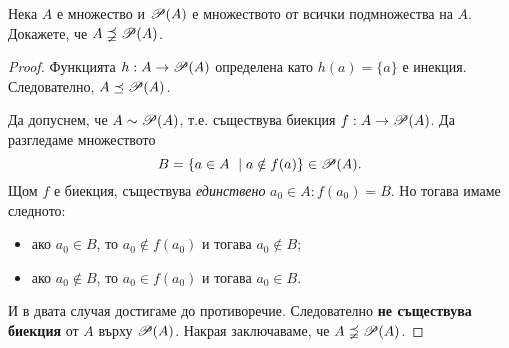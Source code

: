 \begin{thm}
  Нека $A$ е множество и $\mathscr{P}(A)$ е множеството от всички подмножества на $A$.
  Докажете, че $A \precneqq \mathscr{P}(A)$.
\end{thm}
\begin{proof}
  Функцията $h:A \to \mathscr{P}(A)$ определена като $h(a) = \{a\}$ е инекция.
  Следователно, $A \preceq \mathscr{P}(A)$.

  Да допуснем, че $A \sim \mathscr{P}(A)$, т.е. 
  съществува биекция $f:A\rightarrow \mathscr{P}(A)$.
  Да разгледаме множеството \[B=\{a\in A\ \mid a\notin f(a)\}\in\mathscr{P}(A).\]
  Щом $f$ е биекция, съществува {\em единствено} $a_0\in A: f(a_0) = B$.
  Но тогава имаме следното:
  \begin{itemize}
  \item
    ако $a_0\in B$, то $a_0 \not\in f(a_0)$ и тогава $a_0\not\in B$;
  \item
    ако $a_0\not\in B$, то $a_0 \in f(a_0)$ и тогава $a_0\in B$.
  \end{itemize}
  И в двата случая достигаме до противоречие.
  Следователно {\bf не съществува биекция} от $A$ върху $\mathscr{P}(A)$.
  Накрая заключаваме, че $A \precneqq \mathscr{P}(A)$.
\end{proof}


